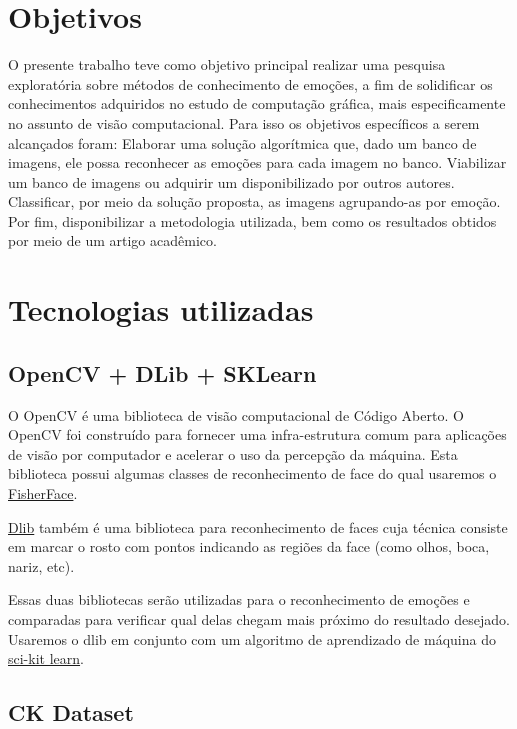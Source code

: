 \documentclass[a4paper, 12pt]{article}
\begin{document}
\section{Objetivos}

O presente trabalho teve como objetivo principal realizar uma pesquisa exploratória sobre métodos de conhecimento de emoções, a fim de solidificar os conhecimentos adquiridos no estudo de computação gráfica, mais especificamente no assunto de visão computacional. Para isso os objetivos específicos a serem alcançados foram: Elaborar uma solução algorítmica que, dado um banco de imagens, ele possa reconhecer as emoções para cada imagem no banco. Viabilizar um banco de imagens ou adquirir um disponibilizado por outros autores. Classificar, por meio da solução proposta, as imagens agrupando-as por emoção. Por fim, disponibilizar a metodologia utilizada, bem como os resultados obtidos por meio de um artigo acadêmico.

\section{Tecnologias utilizadas}

\subsection{OpenCV + DLib + SKLearn}

O OpenCV é uma biblioteca de visão computacional de Código Aberto. O OpenCV foi construído para fornecer uma infra-estrutura comum para aplicações de visão por computador e acelerar o uso da percepção da máquina. Esta biblioteca possui algumas classes de reconhecimento de face do qual usaremos o \href{http://www.scholarpedia.org/article/Fisherfaces}{FisherFace}. 

\href{http://dlib.net/}{Dlib} também é uma biblioteca para reconhecimento de faces cuja técnica consiste em marcar o rosto com pontos indicando as regiões da face (como olhos, boca, nariz, etc).

Essas duas bibliotecas serão utilizadas para o reconhecimento de emoções e comparadas para verificar qual delas chegam mais próximo do resultado desejado. Usaremos o dlib em conjunto com um algoritmo de aprendizado de máquina do \href{http://scikit-learn.org/stable/}{sci-kit learn}.

\subsection{CK Dataset}
\end{document}
